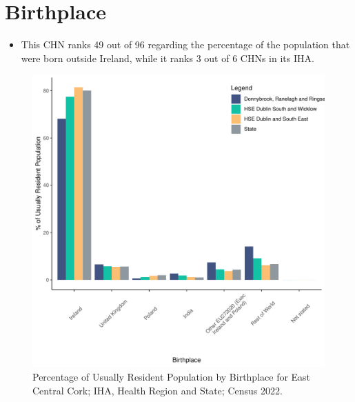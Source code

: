 \documentclass{article}
\begin{document}
\section{Birthplace}\label{sect:Birth}
\begin{itemize}
\item This CHN ranks  49 out of 96 regarding the percentage of the population that were born outside Ireland, while it ranks  3 out of 6 CHNs in its IHA.
\end{itemize}
\begin{figure}[H]
	\centering
	\includegraphics[width = 130mm]{../figures/BirthED.pdf}
	\caption{Percentage of Usually Resident Population by Birthplace for East Central Cork; IHA, Health Region and State; Census 2022.}
	\label{fig:vbnv}
	\end{figure}
	
\end{document}
